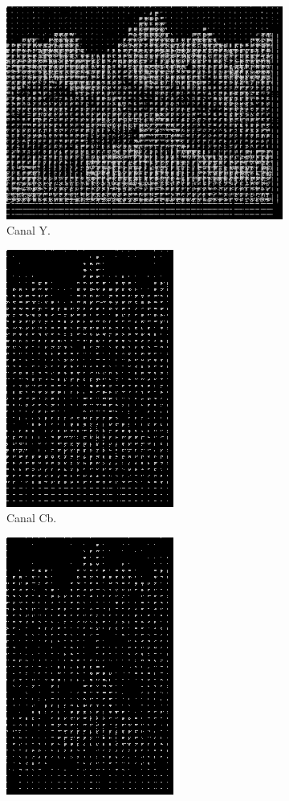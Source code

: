 \documentclass[a4paper, 12pt]{article}
\begin{document}
        \begin{figure}[H]
            \begin{subfigure}{0.3\textwidth}
                \centering
                \includegraphics[scale=0.5] {resources/DPCM/Y_DPCM75.png}
                \caption{ Canal Y.}
            \end{subfigure}
            \hfill
            \begin{subfigure}{0.3\textwidth}
                \centering 
                \includegraphics[scale=0.5]{resources/DPCM/CB_DPCM75.png}
                \caption{ Canal Cb.}
            \end{subfigure}
            \hfill
            \begin{subfigure}{0.3\textwidth}
                \centering
                \includegraphics[scale=0.5]{resources/DPCM/CR_DPCM75.png} 

\end{subfigure}
\end{figure}
\end{document}
